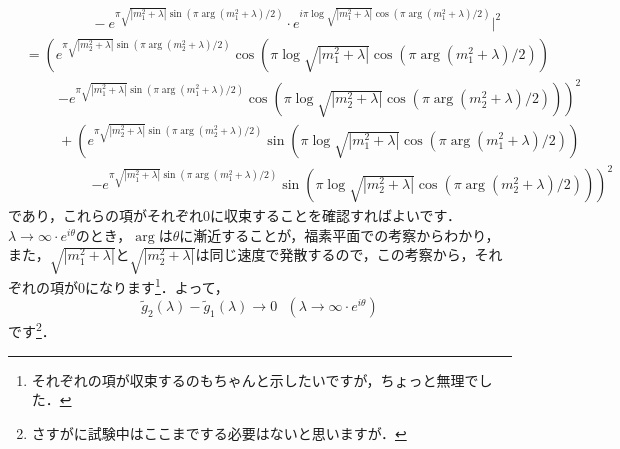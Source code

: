 \documentclass[a4paper,pdflatex,ja=standard]{bxjsarticle}
\begin{document}
\begin{itemize}
\begin{align}
    &\hspace{2cm}
    -
    e^{\pi \sqrt{|m_{1}^2+\lambda|}\sin(\pi\arg(m_{1}^2+\lambda)/2)}\cdot e^{i\pi\log\sqrt{|m_{1}^2+\lambda|}\cos(\pi\arg(m_{1}^{2}+\lambda)/2)}
    |^2
    \nonumber
    \\
    &=
    \left(  
      e^{\pi \sqrt{|m_{2}^2+\lambda|}\sin(\pi\arg(m_{2}^2+\lambda)/2)}
      \cos(\pi\log\sqrt{|m_{1}^2+\lambda|}\cos(\pi\arg(m_{1}^{2}+\lambda)/2))
    \right.
      \nonumber
      \\
      &\hspace{1cm}\left.
      -
      e^{\pi \sqrt{|m_{1}^2+\lambda|}\sin(\pi\arg(m_{1}^2+\lambda)/2)}
      \cos(\pi\log\sqrt{|m_{2}^2+\lambda|}\cos(\pi\arg(m_{2}^2+\lambda)/2))
    \right)^2
    \nonumber
    \\
    &\hspace{1cm}
    +
    \left(  
      e^{\pi \sqrt{|m_{2}^2+\lambda|}\sin(\pi\arg(m_{2}^2+\lambda)/2)}
      \sin(\pi\log\sqrt{|m_{1}^2+\lambda|}\cos(\pi\arg(m_{1}^{2}+\lambda)/2))
    \right.
      \nonumber
      \\
      &\hspace{2cm}\left.
      -
      e^{\pi \sqrt{|m_{1}^2+\lambda|}\sin(\pi\arg(m_{1}^2+\lambda)/2)}
      \sin(\pi\log\sqrt{|m_{2}^2+\lambda|}\cos(\pi\arg(m_{2}^2+\lambda)/2))
    \right)^2
  \end{align}
  であり，これらの項がそれぞれ$0$に収束することを確認すればよいです．$\lambda\rightarrow\infty\cdot e^{i\theta}$のとき，$\arg$は$\theta$に漸近することが，福素平面での考察からわかり，また，$\sqrt{|m_{1}^2+\lambda|}$と$\sqrt{|m_{2}^2+\lambda|}$は同じ速度で発散するので，この考察から，それぞれの項が0になります\footnote{それぞれの項が収束するのもちゃんと示したいですが，ちょっと無理でした．}．よって，
  \begin{equation}
    \tilde{g}_{2}(\lambda)
    -
    \tilde{g}_{1}(\lambda)
    \rightarrow
    0
    \ \ \ 
    (\lambda\rightarrow\infty\cdot e^{i\theta})
  \end{equation}
  です\footnote{さすがに試験中はここまでする必要はないと思いますが．}．

\end{itemize}



\clearpage
\end{document}
